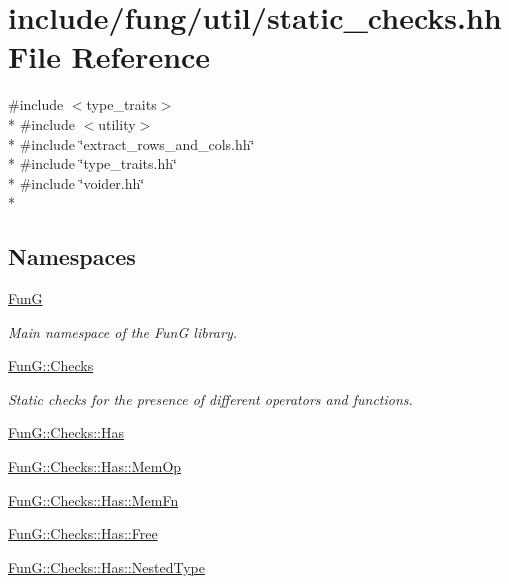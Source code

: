 \hypertarget{static__checks_8hh}{\section{include/fung/util/static\-\_\-checks.hh File Reference}
\label{static__checks_8hh}
}
{\ttfamily \#include $<$type\-\_\-traits$>$}\\*
{\ttfamily \#include $<$utility$>$}\\*
{\ttfamily \#include \char`\"{}extract\-\_\-rows\-\_\-and\-\_\-cols.\-hh\char`\"{}}\\*
{\ttfamily \#include \char`\"{}type\-\_\-traits.\-hh\char`\"{}}\\*
{\ttfamily \#include \char`\"{}voider.\-hh\char`\"{}}\\*
\subsection*{Namespaces}
\begin{DoxyCompactItemize}
\item 
\hyperlink{namespaceFunG}{Fun\-G}
\begin{DoxyCompactList}\small\item\em Main namespace of the Fun\-G library. \end{DoxyCompactList}\item 
\hyperlink{namespaceFunG_1_1Checks}{Fun\-G\-::\-Checks}
\begin{DoxyCompactList}\small\item\em Static checks for the presence of different operators and functions. \end{DoxyCompactList}\item 
\hyperlink{namespaceFunG_1_1Checks_1_1Has}{Fun\-G\-::\-Checks\-::\-Has}
\item 
\hyperlink{namespaceFunG_1_1Checks_1_1Has_1_1MemOp}{Fun\-G\-::\-Checks\-::\-Has\-::\-Mem\-Op}
\item 
\hyperlink{namespaceFunG_1_1Checks_1_1Has_1_1MemFn}{Fun\-G\-::\-Checks\-::\-Has\-::\-Mem\-Fn}
\item 
\hyperlink{namespaceFunG_1_1Checks_1_1Has_1_1Free}{Fun\-G\-::\-Checks\-::\-Has\-::\-Free}
\item 
\hyperlink{namespaceFunG_1_1Checks_1_1Has_1_1NestedType}{Fun\-G\-::\-Checks\-::\-Has\-::\-Nested\-Type}
\end{DoxyCompactItemize}
